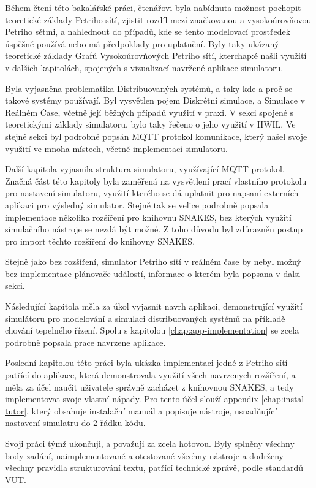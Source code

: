Během čtení této bakalářské práci, čtenářovi byla nabídnuta možnost pochopit teoretické základy Petriho sítí, zjistit rozdíl mezí značkovanou a vysokoúrovňovou Petriho sětmi, a nahlednout do případů, kde se tento modelovací prostředek úspěšně používá nebo má předpoklady pro uplatnění. Byly taky ukázaný teoretické základy Grafů Vysokoúrovňových Petriho sítí, kterchap:é našli využití v dalších kapitolách, spojených s vizualizací navržené aplikace simulatoru.

Byla vyjasněna problematika Distribuovaných systémů, a taky kde a proč se takové systémy používají. Byl vysvětlen pojem Diskrétní simulace, a Simulace v Reálném Čase, včetně její běžných případů využití v praxi. V sekci spojené s teoretickými základy simulatoru, bylo taky řečeno o jeho využití v HWIL. Ve stejné sekci byl podrobně popsán MQTT protokol komunikace, který našel svoje využití ve mnoha místech, včetně implementací simulatoru.

Další kapitola vyjasnila struktura simulatoru, využívající MQTT protokol. Značná část této kapitoly byla zaměřená na vysvětlení prací vlastního protokolu pro nastavení simulatoru, využití kterého se dá uplatnit pro napsaní externích aplikaci pro výsledný simulator. Stejně tak se velice podrobně popsala implementace několika rozšíření pro knihovnu SNAKES, bez kterých využití simulačního nástroje se nezdá být možné. Z toho důvodu byl zdůrazněn postup pro import těchto rozšíření do knihovny SNAKES.

Stejně jako bez rozšíření, simulator Petriho sítí v reálném čase by nebyl možný bez implementace plánovače událostí, informace o kterém byla popsana v dalsi sekci.

Následující kapitola měla za úkol vyjasnit navrh aplikaci, demonstrující využití simulátoru pro modelování a simulaci distribuovaných systémů na příkladě chování tepelného řízení. Spolu s kapitolou \ref{chap:app-implementation} se zcela podrobně popsala prace navrzene aplikace.

Poslední kapitolou této práci byla ukázka implementaci jedné z Petriho sítí patřící do aplikace, která demonstrovala využití všech navrzenych rozšíření, a měla za účel naučit uživatele správně zacházet z knihovnou SNAKES, a tedy implementovat svoje vlastní nápady. Pro tento účel slouží appendix \ref{chap:instal-tutor}, který obsahuje instalační manuál a popisuje nástroje, usnadňující nastavení simulatru do 2 řádku kódu.

Svoji práci týmž ukončuji, a považuji za zcela hotovou. Byly splněny všechny body zadání, naimplementované a otestované všechny nástroje a dodrženy všechny pravidla strukturování textu, patřící technické zprávě, podle standardů VUT.






